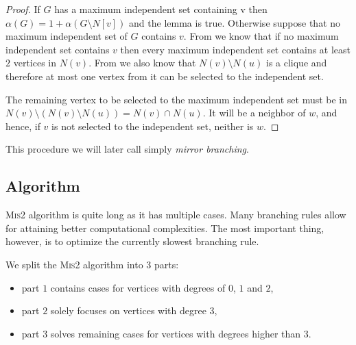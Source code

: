 \begin{proof}
If $G$ has a maximum independent set containing v then $\alpha(G) = 1 + \alpha(G \setminus N[v])$ and the lemma is true. Otherwise suppose that no maximum independent set of $G$ contains $v$. From  we know that if no maximum independent set contains $v$ then every maximum independent set contains at least $2$ vertices in $N(v)$. From  we also know that $N(v) \setminus N(u)$ is a clique and therefore at most one vertex from it can be selected to the independent set.
\begin{figure}[h]
    \centering{}
    \caption{}
    \label{with clique}
\end{figure}

The remaining vertex to be selected to the maximum independent set must be in $N(v) \setminus (N(v) \setminus N(u)) = N(v) \cap N(u)$. It will be a neighbor of $w$, and hence, if $v$ is not selected to the independent set, neither is $w$.
\end{proof}

This procedure we will later call simply \emph{mirror branching}.

\subsection{Algorithm}


\textsc{Mis2} algorithm is quite long as it has multiple cases. Many branching rules allow for attaining better computational complexities. The most important thing, however, is to optimize the currently slowest branching rule.

We split the \textsc{Mis2} algorithm into $3$ parts:  
\begin{itemize} [noitemsep]
    \item part $1$ contains cases for vertices with degrees of $0$, $1$ and $2$,
    \item part $2$ solely focuses on vertices with degree $3$,
    \item part $3$ solves remaining cases for vertices with degrees higher than $3$.
\end{itemize}

